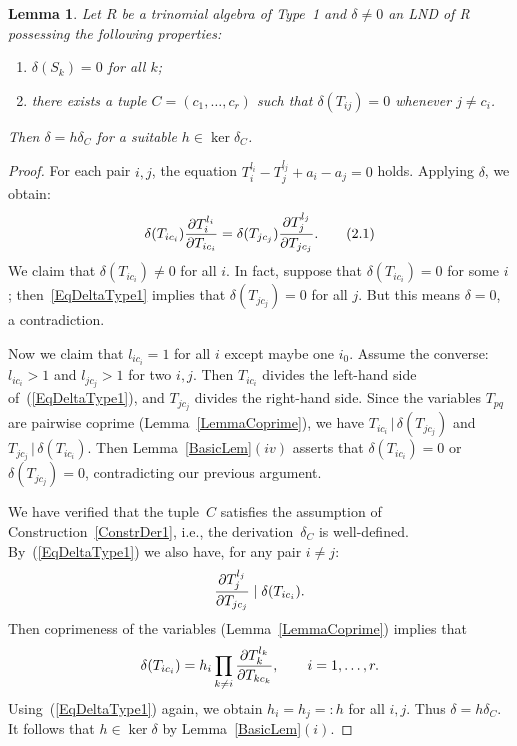 \documentclass[a4paper,reqno,12pt]{amsart}
\theoremstyle{plain}
\theoremstyle{definition}
\theoremstyle{plain}
\newtheorem{lemma}[theorem]{Lemma}
\theoremstyle{remark}
\newcommand{\TT}{\mathbb{T}}
\begin{document}


\begin{lemma}\label{PropositionGoodDerivationType1}
    Let $R$ be a trinomial algebra of Type~1 and $\delta\neq 0$ an LND of R possessing the following properties:
    \begin{enumerate}
        \item [$(a)$] $\delta(S_k)=0$ for all $k$;
        \item[$(b)$] there exists a tuple $C=(c_1,\ldots,c_r)$ such that $\delta(T_{ij})=0$ whenever $j\neq c_i$.
    \end{enumerate}
    Then $\delta=h\delta_C$ for a suitable $h\in\ker\delta_C$.
\end{lemma}
\begin{proof}
    For each pair $i, j$, the equation
    $
    T_i^{l_i}-T_j^{l_j}+a_i-a_j=0
    $
    holds. Applying $\delta$, we obtain:
    \begin{equation}\label{EqDeltaType1}
        \delta(T_{ic_i}){\partial T_i^{l_i}\over\partial T_{ic_i}}=\delta(T_{jc_j}){\partial T_j^{l_j}\over\partial T_{jc_j}}.
        \tag{2.1}
    \end{equation}    
    We claim that $\delta(T_{ic_i})\neq 0$ for all $i$. In fact, suppose that $\delta(T_{ic_i})=0$ for some $i$; then~\eqref{EqDeltaType1} implies that $\delta(T_{jc_j})=0$ for all $j$. But this means $\delta=0$, a contradiction.
    
    Now we claim that $l_{ic_i}=1$ for all $i$ except maybe one $i_0$. Assume the converse: $l_{ic_i}>1$ and $l_{jc_j}>1$ for two $i,j$. Then $T_{ic_i}$ divides the left-hand side of~(\ref{EqDeltaType1}), and $T_{jc_j}$ divides the right-hand side. Since the variables $T_{pq}$ are pairwise coprime (Lemma~\ref{LemmaCoprime}), we have
    $   T_{ic_i}\,|\,\delta(T_{j{c_j}})$ and $ T_{jc_j}\,|\,\delta(T_{ic_i}).
    $
    Then Lemma~\ref{BasicLem}$(iv)$ asserts that $\delta(T_{ic_i})=0$ or $\delta(T_{jc_j})=0$, contradicting our previous argument.

    We have verified that the tuple~$C$ satisfies the assumption of Construction~\ref{ConstrDer1}, i.e., the derivation~$\delta_C$ is well-defined. By~(\ref{EqDeltaType1}) we also have, for any pair $i\neq j$: $${\partial T_j^{l_j}\over\partial T_{jc_j}}\mid\delta(T_{ic_i}).$$ Then coprimeness of the variables (Lemma~\ref{LemmaCoprime}) implies that 
    $$\delta(T_{ic_{i}})=h_i\prod_{k\neq {i}} {\partial T_k^{l_k}\over\partial T_{kc_k}},
    \qquad i=1,\ldots,r.
    $$  
    Using~(\ref{EqDeltaType1}) again, we obtain $h_i=h_j=:h$ for all $i,j$. Thus $\delta=h\delta_C$. It follows that $h\in\ker\delta$ by Lemma~\ref{BasicLem}$(i)$.
\end{proof}
\end{document}

